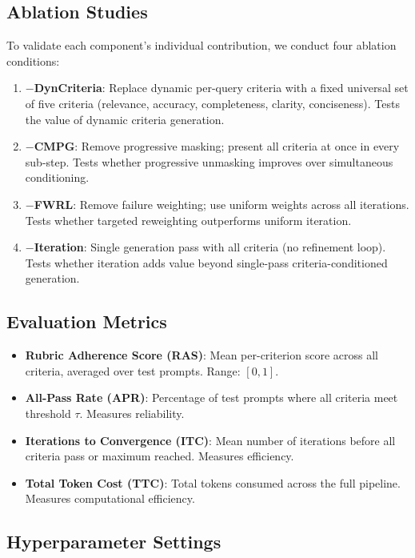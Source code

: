 \documentclass[11pt]{article}
\newcommand{\cmpg}{\textsc{CMPG}}
\newcommand{\fwrl}{\textsc{FWRL}}
\begin{document}
\subsection{Ablation Studies}

To validate each component's individual contribution, we conduct four ablation conditions:
\begin{enumerate}[leftmargin=*]
    \item \textbf{$-$DynCriteria}: Replace dynamic per-query criteria with a fixed universal set of five criteria (relevance, accuracy, completeness, clarity, conciseness). Tests the value of dynamic criteria generation.
    \item \textbf{$-$\cmpg{}}: Remove progressive masking; present all criteria at once in every sub-step. Tests whether progressive unmasking improves over simultaneous conditioning.
    \item \textbf{$-$\fwrl{}}: Remove failure weighting; use uniform weights across all iterations. Tests whether targeted reweighting outperforms uniform iteration.
    \item \textbf{$-$Iteration}: Single generation pass with all criteria (no refinement loop). Tests whether iteration adds value beyond single-pass criteria-conditioned generation.
\end{enumerate}

\subsection{Evaluation Metrics}

\begin{itemize}[leftmargin=*]
    \item \textbf{Rubric Adherence Score (RAS)}: Mean per-criterion score across all criteria, averaged over test prompts. Range: $[0, 1]$.
    \item \textbf{All-Pass Rate (APR)}: Percentage of test prompts where all criteria meet threshold $\tau$. Measures reliability.
    \item \textbf{Iterations to Convergence (ITC)}: Mean number of iterations before all criteria pass or maximum reached. Measures efficiency.
    \item \textbf{Total Token Cost (TTC)}: Total tokens consumed across the full pipeline. Measures computational efficiency.
\end{itemize}

\subsection{Hyperparameter Settings}
\end{document}
